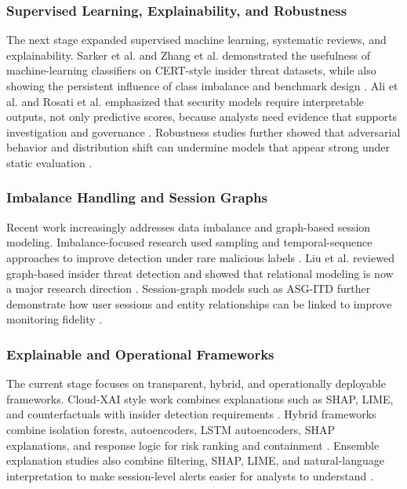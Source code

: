 \documentclass[journal]{IEEEtran}
\begin{document}
\subsubsection{Supervised Learning, Explainability, and Robustness}
The next stage expanded supervised machine learning, systematic reviews, and explainability. Sarker et al. and Zhang et al. demonstrated the usefulness of machine-learning classifiers on CERT-style insider threat datasets, while also showing the persistent influence of class imbalance and benchmark design \cite{sarker2023insider,zhang2023supervised}. Ali et al. and Rosati et al. emphasized that security models require interpretable outputs, not only predictive scores, because analysts need evidence that supports investigation and governance \cite{ali2023xai,rosati2023blackbox}. Robustness studies further showed that adversarial behavior and distribution shift can undermine models that appear strong under static evaluation \cite{apruzzese2023robustness,alani2023adversarial}.

\subsubsection{Imbalance Handling and Session Graphs}
Recent work increasingly addresses data imbalance and graph-based session modeling. Imbalance-focused research used sampling and temporal-sequence approaches to improve detection under rare malicious labels \cite{balanced2024imbalance}. Liu et al. reviewed graph-based insider threat detection and showed that relational modeling is now a major research direction \cite{liu2024graph}. Session-graph models such as ASG-ITD further demonstrate how user sessions and entity relationships can be linked to improve monitoring fidelity \cite{asg2024}.

\subsubsection{Explainable and Operational Frameworks}
The current stage focuses on transparent, hybrid, and operationally deployable frameworks. Cloud-XAI style work combines explanations such as SHAP, LIME, and counterfactuals with insider detection requirements \cite{cloudxai2025}. Hybrid frameworks combine isolation forests, autoencoders, LSTM autoencoders, SHAP explanations, and response logic for risk ranking and containment \cite{aibitd2026}. Ensemble explanation studies also combine filtering, SHAP, LIME, and natural-language interpretation to make session-level alerts easier for analysts to understand \cite{illuminating2026}.
\end{document}
